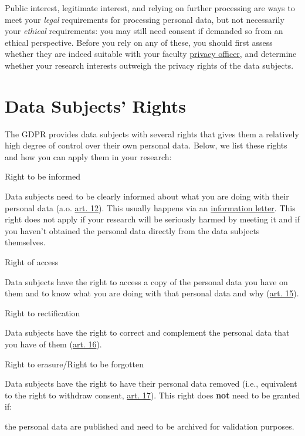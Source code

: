 \documentclass[
]{book}
\begin{document}
Public interest, legitimate interest, and relying on further processing are ways
to meet your \emph{legal} requirements for processing personal data, but not
necessarily your \emph{ethical} requirements: you may still need consent if demanded
so from an ethical perspective. Before you rely on any of these, you should
first assess whether they are indeed suitable with your faculty \protect\hyperlink{support}{privacy officer},
and determine whether your research interests outweigh the privacy rights of
the data subjects.

\hypertarget{data-subject-rights}{%
\section{Data Subjects' Rights}\label{data-subject-rights}}

The GDPR provides data subjects with several rights that gives them a relatively
high degree of control over their own personal data. Below, we list these rights
and how you can apply them in your research:

Right to be informed

Data subjects need to be clearly informed about what you are doing with their
personal data (a.o. \href{https://gdpr-info.eu/art-12-gdpr/}{art. 12}).
This usually happens via an \protect\hyperlink{privacy-notices}{information letter}. This right
does not apply if your research will be seriously harmed by meeting it and if
you haven't obtained the personal data directly from the data subjects themselves.

Right of access

Data subjects have the right to access a copy of the personal data you have
on them and to know what you are doing with that personal data and why
(\href{https://gdpr-info.eu/art-15-gdpr/}{art. 15}).

Right to rectification

Data subjects have the right to correct and complement the personal data
that you have of them
(\href{https://gdpr-info.eu/art-16-gdpr/}{art. 16}).

Right to erasure/Right to be forgotten

Data subjects have the right to have their personal data removed (i.e.,
equivalent to the right to withdraw consent,
\href{https://gdpr-info.eu/art-17-gdpr/}{art. 17}).
This right does \textbf{not} need to be granted if:

the personal data are published and need to be archived for validation
purposes.
\end{document}
